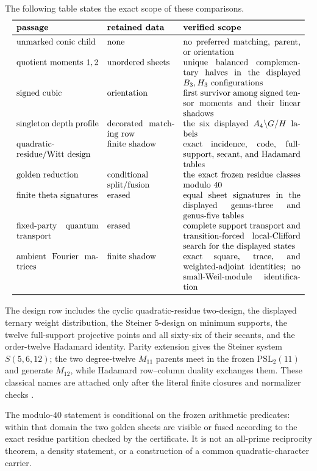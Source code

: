 \documentclass[11pt]{article}
\theoremstyle{definition}
\theoremstyle{remark}
\begin{document}
The following table states the exact scope of these comparisons.
\[
\begin{array}{p{0.28\linewidth}p{0.23\linewidth}p{0.40\linewidth}}
\toprule
\textbf{passage}&\textbf{retained data}&\textbf{verified scope}\\
\midrule
unmarked conic child&none&no preferred matching, parent, or orientation\\
quotient moments $1,2$&unordered sheets&unique balanced complementary
halves in the displayed $B_3,H_3$ configurations\\
signed cubic&orientation&first survivor among signed tensor moments and
their linear shadows\\
singleton depth profile&decorated matching row&the six displayed
$A_4\backslash G/H$ labels\\
quadratic-residue/Witt design&finite shadow&exact incidence, code,
full-support, secant, and Hadamard tables\\
golden reduction&conditional split/fusion&the exact frozen residue classes
modulo $40$\\
finite theta signatures&erased&equal sheet signatures in the displayed
genus-three and genus-five tables\\
fixed-party quantum transport&erased&complete support transport and
transition-forced local-Clifford search for the displayed states\\
ambient Fourier matrices&finite shadow&exact square, trace, and
weighted-adjoint identities; no small-Weil-module identification\\
\bottomrule
\end{array}
\]

The design row includes the cyclic quadratic-residue two-design, the
displayed ternary weight distribution, the Steiner $5$-design on minimum
supports, the twelve full-support projective points and all sixty-six of
their secants, and the order-twelve Hadamard identity.  Parity extension
gives the Steiner system $S(5,6,12)$; the two degree-twelve $M_{11}$
parents meet in the frozen $\mathrm{PSL}_2(11)$ and generate $M_{12}$, while
Hadamard row--column duality exchanges them.  These classical names are
attached only after the literal finite closures and normalizer checks
\cite{Witt1938,Atlas1985,ConwaySloane1999}.

The modulo-$40$ statement is conditional on the frozen arithmetic
predicates: within that domain the two golden sheets are visible or fused
according to the exact residue partition checked by the certificate.  It
is not an all-prime reciprocity theorem, a density statement, or a
construction of a common quadratic-character carrier.
\end{document}
